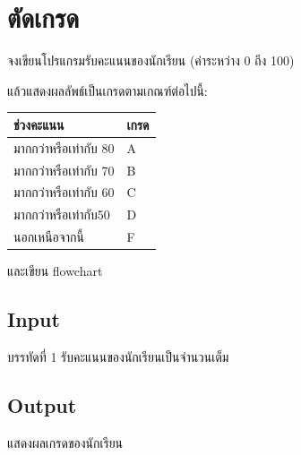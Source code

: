 \documentclass{article}
\begin{document}
\section*{ตัดเกรด}

จงเขียนโปรแกรมรับคะแนนของนักเรียน (ค่าระหว่าง 0 ถึง 100)

แล้วแสดงผลลัพธ์เป็นเกรดตามเกณฑ์ต่อไปนี้:\\



{\def\LTcaptype{none} %

\begin{longtable}[]{@{}ll@{}}

\toprule\noalign{}

ช่วงคะแนน & เกรด \\

\midrule\noalign{}

\endhead

\bottomrule\noalign{}

\endlastfoot

มากกว่าหรือเท่ากับ 80 & A \\

มากกว่าหรือเท่ากับ 70 & B \\

มากกว่าหรือเท่ากับ 60 & C \\

มากกว่าหรือเท่ากับ50 & D \\

นอกเหนือจากนี้ & F \\

\end{longtable}

}



และเขียน flowchart



\subsection*{Input}
{บรรทัดที่ 1 รับคะแนนของนักเรียนเป็นจำนวนเต็ม}\\



\subsection*{Output}
{แสดงผลเกรดของนักเรียน}\\
\end{document}
